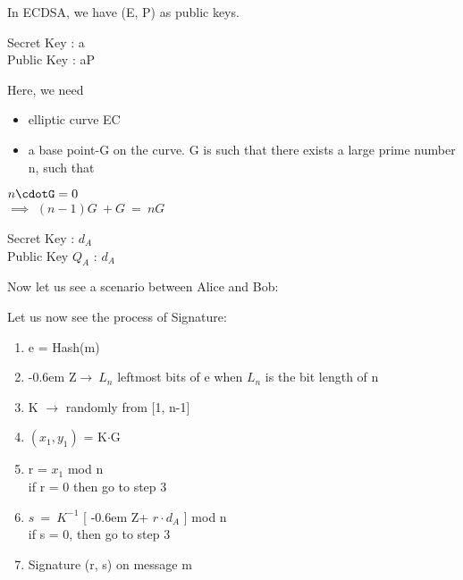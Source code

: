 \documentclass[11pt]{article}
\newcommand{\zbar}{\raisebox{0.2ex}{--}\kern-0.6em Z}
\begin{document}
In ECDSA, we have (E, P) as public keys.\\
\begin{center}
    Secret Key : a\\
    Public Key : aP\\
\end{center}
Here, we need 
\begin{itemize}
    \item elliptic curve EC
    \item a base point-G on the curve. G is such that there exists a large prime number n, such that
\end{itemize}
\begin{center}
    $n\cdotG = 0$\\
    $\implies$ $(n-1)G\ \boxed{+} G\ =\ nG$\\
\end{center}
\begin{center}
    Secret Key : $d_A$\\
    Public Key $Q_A$ : $d_A$
\end{center}
Now let us see a scenario between Alice and Bob:
\begin{center}
\end{center}
Let us now see the process of Signature:
\begin{enumerate}
    \item e = Hash(m)
    \item \zbar $\rightarrow\ L_n$ leftmost bits of e when $L_n$ is the bit length of n
    \item K $\rightarrow$ randomly from [1, n-1]
    \item $(x_1, y_1)$ = K$\cdot$G
    \item r = $x_1$ mod n\\
    if r = 0 then go to step 3\\
    \item $s\ =\ K^{-1}$ [ \zbar + $r \cdot d_A $  ] mod n\\
    if s = 0, then go to step 3
    \item Signature (r, s) on message m
\end{enumerate}
\end{document}
